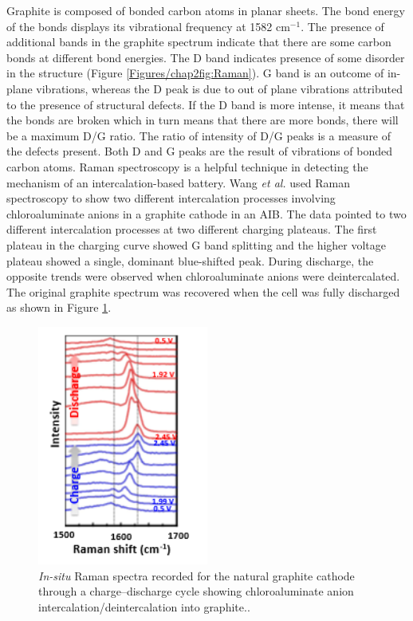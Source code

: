 Graphite is composed of  bonded carbon atoms in planar sheets. The bond energy of the  bonds displays its vibrational frequency at 1582 cm$^{-1}$. The presence of additional bands in the graphite spectrum indicate that there are some carbon bonds at different bond energies. The D band indicates presence of some disorder in the structure (Figure \ref{Figures/chap2fig:Raman}). G band is an outcome of in-plane vibrations, whereas the D peak is due to out of plane vibrations attributed to the presence of structural defects. If the D band is more intense, it means that the  bonds are broken which in turn means that there are more  bonds, there will be a maximum D/G ratio. The ratio of intensity of D/G peaks is a measure of the defects present. Both D and G peaks are the result of vibrations of  bonded carbon atoms.  
Raman spectroscopy is a helpful technique in detecting the mechanism of an intercalation-based battery. Wang \textit{et al.} used Raman spectroscopy to show two different intercalation processes involving chloroaluminate anions in a graphite cathode in an AIB. The data pointed to two different intercalation processes at two different charging plateaus. The first plateau in the charging curve showed G band splitting and the higher voltage plateau showed a single, dominant blue-shifted peak. During discharge, the opposite trends were observed when chloroaluminate anions were deintercalated. The original graphite spectrum was recovered when the cell was fully discharged\cite{wang_advanced_2017} as shown in Figure \ref{Figures/chap2fig:Raman2}. 

\begin{figure}[tbh!]
\centering
\includegraphics[width=0.5\textwidth]{Figures/chap2fig/Raman2}
\caption{\textit{In-situ} Raman spectra recorded for the natural graphite cathode through a charge–discharge cycle showing chloroaluminate anion intercalation/deintercalation into graphite.\cite{wang_advanced_2017}.}
\label{Figures/chap2fig:Raman2}
\end{figure}

